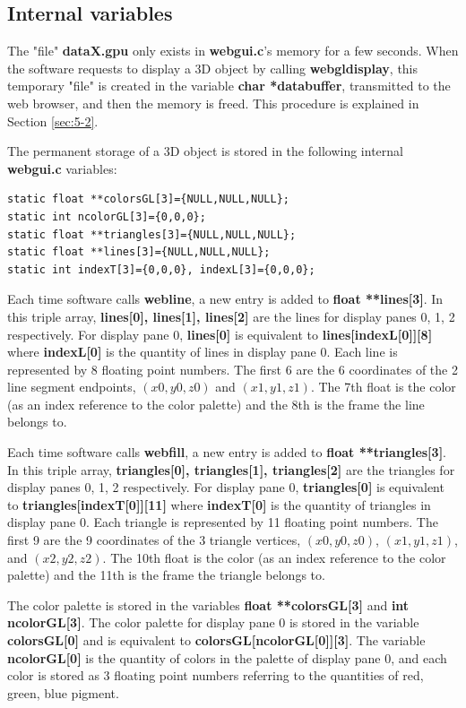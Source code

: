 \subsection{Internal variables}

The "file" \textbf{dataX.gpu} only exists in \textbf{webgui.c}'s memory for a few seconds. When the software requests to display a 3D object by
calling \textbf{webgldisplay}, this temporary "file" is created in the variable \textbf{char *databuffer}, transmitted to the web browser, and then the 
memory is freed. This procedure is explained in Section \ref{sec:5-2}.

The permanent storage of a 3D object is stored in the following internal \textbf{webgui.c} variables:
\begin{verbatim}
static float **colorsGL[3]={NULL,NULL,NULL};
static int ncolorGL[3]={0,0,0};
static float **triangles[3]={NULL,NULL,NULL};
static float **lines[3]={NULL,NULL,NULL};
static int indexT[3]={0,0,0}, indexL[3]={0,0,0};
\end{verbatim}

Each time software calls \textbf{webline}, a new entry is added to \textbf{float **lines[3]}. In this triple array, \textbf{lines[0], lines[1], lines[2]}
are the lines for display panes 0, 1, 2 respectively. For display pane 0, \textbf{lines[0]} is equivalent to \textbf{lines[indexL[0]][8]} where
\textbf{indexL[0]} is the quantity of lines in display pane 0. Each line is represented by 8 floating point numbers. The first 6 are the 6 coordinates
of the 2 line segment endpoints, $(x0,y0,z0)$ and $(x1,y1,z1)$. The 7th float is the color (as an index reference to the color palette) and the 8th 
is the frame the line belongs to.

Each time software calls \textbf{webfill}, a new entry is added to \textbf{float **triangles[3]}. In this triple array, \textbf{triangles[0], triangles[1], 
triangles[2]} are the triangles for display panes 0, 1, 2 respectively. For display pane 0, \textbf{triangles[0]} is equivalent to 
\textbf{triangles[indexT[0]][11]} where \textbf{indexT[0]} is the quantity of triangles in display pane 0. Each triangle is represented by 11 floating point 
numbers. The first 9 are the 9 coordinates of the 3 triangle vertices, $(x0,y0,z0)$, $(x1,y1,z1)$, and $(x2,y2,z2)$. The 10th float is the color (as an index 
reference to the color palette) and the 11th is the frame the triangle belongs to.

The color palette is stored in the variables \textbf{float **colorsGL[3]} and \textbf{int ncolorGL[3]}. The color palette for display pane 0 is stored 
in the variable \textbf{colorsGL[0]} and is equivalent to \textbf{colorsGL[ncolorGL[0]][3]}. The variable \textbf{ncolorGL[0]} is the quantity of colors
in the palette of display pane 0, and each color is stored as 3 floating point numbers referring to the quantities of red, green, blue pigment.


